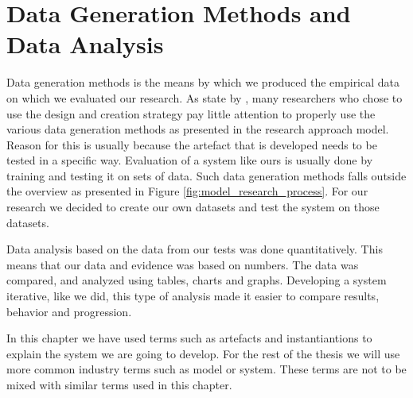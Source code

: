 \section{Data Generation Methods and Data Analysis}
\label{sec:data_generation_methods_and_data_analysis}
Data generation methods is the means by which we produced the empirical data on which we evaluated our research. As state by \citep{oates2005researching}, many researchers who chose to use the design and creation strategy pay little attention to properly use the various data generation methods as presented in the research approach model. Reason for this is usually because the artefact that is developed needs to be tested in a specific way. Evaluation of a system like ours is usually done by training and testing it on sets of data. Such data generation methods falls outside the overview as presented in Figure \ref{fig:model_research_process}. For our research we decided to create our own datasets and test the system on those datasets.

Data analysis based on the data from our tests was done quantitatively. This means that our data and evidence was based on numbers. The data was compared, and analyzed using tables, charts and graphs. Developing a system iterative, like we did, this type of analysis made it easier to compare results, behavior and progression.

\vspace{5mm}
\begin{note}
    In this chapter we have used terms such as artefacts and instantiantions to explain the system we are going to develop. For the rest of the thesis we will use more common industry terms such as model or system. These terms are not to be mixed with similar terms used in this chapter. 
\end{note}